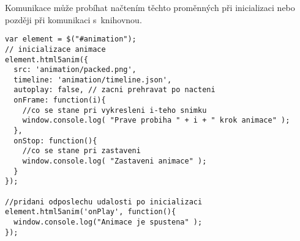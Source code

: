 Komunikace může probíhat načtením těchto proměnných při inicializaci nebo později při komunikaci s~knihovnou.

\begin{lstlisting}
var element = $("#animation");
// inicializace animace
element.html5anim({
  src: 'animation/packed.png',
  timeline: 'animation/timeline.json',
  autoplay: false, // zacni prehravat po nacteni
  onFrame: function(i){
    //co se stane pri vykresleni i-teho snimku
    window.console.log( "Prave probiha " + i + " krok animace" );
  },
  onStop: function(){
    //co se stane pri zastaveni
    window.console.log( "Zastaveni animace" );
  }
});

//pridani odposlechu udalosti po inicializaci
element.html5anim('onPlay', function(){
  window.console.log("Animace je spustena" );
});


\end{lstlisting}